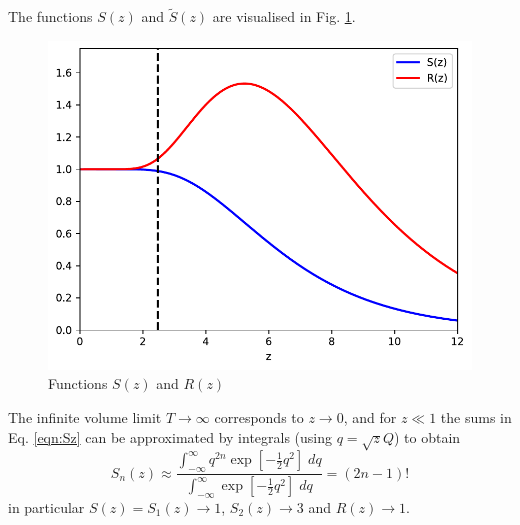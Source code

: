 \documentclass[11pt]{article}
\begin{document}
The functions $S(z)$ and $\tilde{S}(z)$ are visualised in Fig. \ref{fig:Splot}.
\begin{figure}
  \begin{center}
    \includegraphics[width=0.5\linewidth]{SandR.pdf}
    \caption{Functions $S(z)$ and $R(z)$}
    \label{fig:Splot}
  \end{center}
\end{figure}
The infinite volume limit $T\rightarrow\infty$ corresponds to $z\rightarrow 0$, and for $z\ll 1$ the sums in Eq. \eqref{eqn:Sz} can be approximated by integrals (using $q=\sqrt{z}Q$) to obtain
\begin{equation}
  S_n(z) \approx \frac{\int_{-\infty}^\infty q^{2n} \exp\left[-\frac{1}{2}q^2\right]\;dq}{\int_{-\infty}^\infty \exp\left[-\frac{1}{2}q^2\right]\;dq}=(2n-1)!
\end{equation}
in particular $S(z)=S_1(z)\rightarrow 1$, $S_2(z)\rightarrow 3$ and $R(z)\rightarrow 1$.


\end{document}
